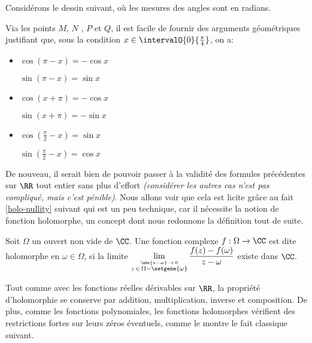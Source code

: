Considérons le dessin suivant, où les mesures des angles sont en radians.

\begin{center}
\end{center}

Via les points $M$, $N$ , $P$ et $Q$, il est facile de fournir des arguments géométriques justifiant que, sous la condition $x \in \intervalO{0}{\frac{\pi}{4}}$, on a:
%
\begin{multicols}{3}
\begin{itemize}[label=\small\textbullet]
	\item $\cos (\pi - x) = - \cos x$

	      \noindent
	      $\sin (\pi - x) = \sin x$ 

	\item $\cos (x + \pi) = - \cos x$

	      \noindent
	      $\sin (x + \pi) = - \sin x$

	\item $\cos \left( \frac{\pi}{2} - x \right) = \sin x$

	      \noindent
	      $\sin \left( \frac{\pi}{2} - x \right) = \cos x$ 
\end{itemize}
\end{multicols}


De nouveau, il serait bien de pouvoir passer à la validité des formules précédentes sur $\RR$ tout entier sans plus d'effort \emph{(considérer les autres cas n'est pas compliqué, mais c'est pénible)}.
%
Nous allons voir que cela est licite grâce au fait \ref{holo-nullity} suivant qui est un peu technique, car il nécessite la notion de fonction holomorphe, un concept dont nous redonnons la définition tout de suite.


\begin{definition*}
    Soit $\Omega$ un ouvert non vide de $\CC$.
	Une fonction complexe $f: \Omega \rightarrow \CC$ est dite holomorphe en $\omega \in \Omega$, 
	si la limite 
	$\displaystyle \lim_{\stackrel{\abs{z - \omega} \, \rightarrow \, 0}{z \, \in \, \Omega - \setgene{\omega}}} \frac{f(z) - f(\omega)}{z - \omega}$
	existe dans $\CC$.
\end{definition*}


\medskip

Tout comme avec les fonctions réelles dérivables sur $\RR$, la propriété d'holomorphie se conserve par addition, multiplication, inverse et composition.
De plus, comme les fonctions polynomiales, les fonctions holomorphes vérifient des restrictions fortes sur leurs zéros éventuels, comme le montre le fait classique suivant.

